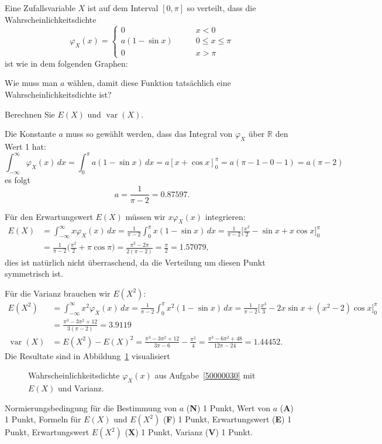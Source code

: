 Eine Zufallsvariable $X$ ist auf dem Interval $[0,\pi]$ so verteilt,
dass die Wahrscheinlichkeitsdichte
\[
\varphi_X(x)
=
\begin{cases}
0&\qquad x < 0\\
a(1-\sin x)&\qquad 0\le x \le \pi\\
0&\qquad x > \pi
\end{cases}
\]
ist wie in dem folgenden Graphen:
\begin{center}
\end{center}
\begin{teilaufgaben}
\item
Wie muss man $a$ wählen, damit diese Funktion tatsächlich 
eine Wahrscheinlichkeitsdichte ist?
\item
Berechnen Sie $E(X)$ und $\operatorname{var}(X)$.
\end{teilaufgaben}

\begin{loesung}
\begin{teilaufgaben}
\item Die Konstante $a$ muss so gewählt werden, dass das Integral von
$\varphi_X$ über $\mathbb R$ den Wert 1 hat:
\[
\int_{-\infty}^{\infty}\varphi_X(x)\,dx
=
\int_0^\pi a(1-\sin x)\,dx
=
a[x+\cos x]_0^\pi
=
a(\pi - 1 - 0 - 1) = a(\pi-2)
\]
es folgt
\[
a=\frac1{\pi -2}=0.87597.
\]
\item
Für den Erwartungswert $E(X)$ müssen wir $x\varphi_X(x)$ integrieren:
\begin{align*}
E(X)
&=
\int_{-\infty}^\infty x\varphi_X(x)\,dx
=
\frac1{\pi-2}\int_0^\pi x(1-\sin x)\,dx
=
\frac1{\pi - 2} \biggl[\frac{x^2}{2}-\sin x + x\cos x\biggr]_0^\pi
\\
&=
\frac1{\pi - 2}\biggl(\frac{\pi^2}{2} +\pi\cos\pi\biggr)
=
\frac{\pi^2-2\pi}{2(\pi-2)}=\frac{\pi}{2} = 1.57079,
\end{align*}
dies ist natürlich nicht überraschend, da die Verteilung um diesen
Punkt symmetrisch ist.

Für die Varianz brauchen wir $E(X^2)$:
\begin{align*}
E(X^2)
&=
\int_{-\infty}^\infty x^2\varphi_X(x)\,dx
=
\frac1{\pi-2}\int_0^\pi x^2(1-\sin x)\,dx
=
\frac1{\pi-2}\biggl[
\frac{x^3}{3}-2x\sin x+(x^2-2)\cos x
\biggr]_0^\pi
\\
&=
\frac{\pi^3-3\pi^2+12}{3(\pi-2)}
=
3.9119
\\
\operatorname{var}(X)
&=
E(X^2)-E(X)^2
=
\frac{\pi^3-3\pi^2+12}{3\pi - 6}
-
\frac{\pi^2}{4}
=
\frac {\pi^3-6\pi^2+48}{12\pi-24}
=
1.44452.
\end{align*}
Die Resultate sind in Abbildung~\ref{50000030:graphplus} visualisiert
\begin{figure}
\centering
{}
\caption{Wahrscheinlichkeitsdichte $\varphi_X(x)$ aus Aufgabe~\ref{50000030}
mit $E(X)$ und Varianz.
\label{50000030:graphplus}}
\end{figure}
\end{teilaufgaben}
\end{loesung}

\begin{bewertung}
Normierungsbedingung für die Bestimmung von $a$ ({\bf N}) 1 Punkt,
Wert von $a$ ({\bf A}) 1 Punkt,
Formeln für $E(X)$ und $E(X^2)$ ({\bf F}) 1 Punkt,
Erwartungswert ({\bf E}) 1 Punkt,
Erwartungswert $E(X^2)$ ({\bf X}) 1 Punkt,
Varianz ({\bf V}) 1 Punkt.
\end{bewertung}

